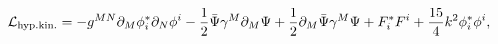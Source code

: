\begin{equation}
  {\cal L}_{\rm hyp.kin.}
    = -g^{MN} \partial_M\phi^*_i \partial_N\phi^i
      -\frac12 \bar{\Psi} \gamma^M \partial_M\Psi
      +\frac12 \partial_M\bar{\Psi} \gamma^M \Psi
      +F^*_iF^i + \frac{15}{4}k^2 \phi^*_i\phi^i,
\label{eq:hyperaction}
\end{equation}

